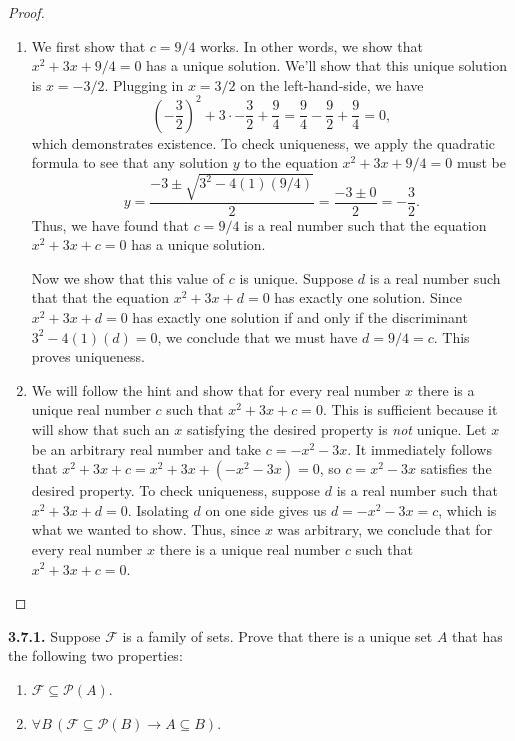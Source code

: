\documentclass[12pt]{amsart}
\newenvironment{statement}[1]{\smallskip\noindent\color[rgb]{.6627, .3529, .6314} {\bf #1.}}{}
\theoremstyle{definition}
\theoremstyle{remark}
\newcommand{\powerset}[1]{\mathscr{P} \left( #1 \right)}
\begin{document}
\begin{proof}
\hfill
\begin{enumerate}
	\item We first show that $c = 9/4$ works.
	In other words, we show that $x^2 + 3x + 9/4 = 0$ has a unique solution.
	We'll show that this unique solution is $x = -3/2$.
	Plugging in $x = 3/2$ on the left-hand-side, we have
	\begin{equation*}
		\left( -\frac{3}{2} \right)^2 + 3 \cdot -\frac{3}{2} + \frac{9}{4}
		= \frac{9}{4} - \frac{9}{2} + \frac{9}{4}
		= 0,
	\end{equation*}
	which demonstrates existence.
	To check uniqueness, we apply the quadratic formula to see that any solution $y$
	to the equation $x^2 + 3x + 9/4 = 0$ must be
	\begin{equation*}
		y = \frac{-3 \pm \sqrt{3^2 - 4(1)(9/4)}}{2}
		= \frac{-3 \pm 0}{2} = -\frac{3}{2}.
	\end{equation*}
	Thus, we have found that $c = 9/4$ is a real number such that the equation $x^2 + 3x + c = 0$
	has a unique solution.
	
	Now we show that this value of $c$ is unique.
	Suppose $d$ is a real number such that that the equation $x^2 + 3x + d = 0$ has exactly
	one solution.
	Since $x^2 + 3x + d = 0$ has exactly one solution if and only if the discriminant
	$3^2 - 4(1)(d) = 0$, we conclude that we must have $d = 9/4 = c$.
	This proves uniqueness.
	
	\item We will follow the hint and show that for every real number $x$ there is a unique
	real number $c$ such that $x^2 + 3x + c = 0$.
	This is sufficient because it will show that such an $x$ satisfying the desired property is \emph{not}
	unique.
	Let $x$ be an arbitrary real number and take $c = -x^2 - 3x$.
	It immediately follows that $x^2 + 3x + c = x^2 + 3x + (-x^2 - 3x) = 0$, so $c = x^2 - 3x$
	satisfies the desired property.
	To check uniqueness, suppose $d$ is a real number such that $x^2 + 3x + d = 0$.
	Isolating $d$ on one side gives us $d = -x^2 - 3x = c$, which is what we wanted to show.
	Thus, since $x$ was arbitrary, we conclude that for every real number $x$ there is a unique
	real number $c$ such that $x^2 + 3x + c = 0$.
\end{enumerate}
\end{proof}


\begin{statement}{3.7.1}
Suppose $\mathcal{F}$ is a family of sets.
Prove that there is a unique set $A$ that has the following two properties:
\begin{enumerate}
	\item $\mathcal{F} \subseteq \powerset{A}$.
	
	\item $\forall B \, (\mathcal{F} \subseteq \powerset{B} \rightarrow A \subseteq B)$.
\end{enumerate}
\end{statement}
\end{document}
